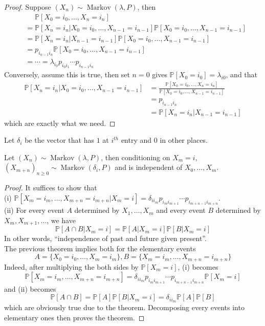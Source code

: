 \begin{proof}
    Suppose $(X_n)\sim\operatorname{Markov}(\lambda,P)$, then
    \begin{align*}
        &\phantom{=}\mathbb P[X_0=i_0,\ldots,X_n=i_n]\\
        &=\mathbb P[X_n=i_n|X_0=i_0,\ldots,X_{n-1}=i_{n-1}]\mathbb P[X_0=i_0,\ldots,X_{n-1}=i_{n-1}]\\
        &=\mathbb P[X_n=i_n|X_{n-1}=i_{n-1}]\mathbb P[X_0=i_0,\ldots,X_{n-1}=i_{n-1}]\\
        &=p_{i_{n-1}i_n}\mathbb P[X_0=i_0,\ldots,X_{n-1}=i_{n-1}]\\
        &=\cdots=\lambda_{i_0}p_{i_0i_1}\cdots p_{i_{n-1}i_n}
    \end{align*}
    Conversely, assume this is true, then set $n=0$ gives $\mathbb P[X_0=i_0]=\lambda_{i0}$, and that
    \begin{align*}
        \mathbb P[X_n=i_n|X_0=i_0,\ldots,X_{n-1}=i_{n-1}]&=\frac{\mathbb P[X_0=i_0,\ldots,X_n=i_n]}{\mathbb P[X_0=i_0,\ldots,X_{n-1}=i_{n-1}]}\\
        &=p_{i_{n-1}i_n}\\
        &=\mathbb P[X_n=i_n|X_{n-1}=i_{n-1}]
    \end{align*}
    which are exactly what we need.
\end{proof}
Let $\delta_i$ be the vector that has $1$ at $i^{th}$ entry and $0$ in other places.
\begin{theorem}
    Let $(X_n)\sim\operatorname{Markov}(\lambda,P)$, then conditioning on $X_m=i$, $(X_{m+n})_{n\ge 0}\sim\operatorname{Markov}(\delta_i,P)$ and is independent of $X_0,\ldots,X_m$.
\end{theorem}
\begin{proof}
    It suffices to show that\\
    (i) $\mathbb P[X_m=i_m,\ldots,X_{m+n}=i_{m+n}|X_m=i]=\delta_{ii_m}p_{i_mi_{m+1}}\cdots p_{i_{m+n-1}i_{m+n}}$.\\
    (ii) For every event $A$ determined by $X_1,\ldots,X_m$ and every event $B$ determined by $X_m,X_{m+1},\ldots$, we have
    $$\mathbb P[A\cap B|X_m=i]=\mathbb P[A|X_m=i]\mathbb P[B|X_m=i]$$
    In other words, ``independence of past and future given present''.\\
    The previous theorem implies both for the elementary events
    $$A=\{X_0=i_0,\ldots,X_m=i_m\},B=\{X_m=i_m,\ldots,X_{m+n}=i_{m+n}\}$$
    Indeed, after multiplying the both sides by $\mathbb P[X_m=i]$, (i) becomes
    $$\mathbb P[X_m=i_m,\ldots,X_{m+n}=i_{m+n}]=\delta_{ii_m}p_{i_mi_{m+1}}\cdots p_{i_{m+n-1}i_{m+n}}\mathbb P[X_m=i]$$
    and (ii) becomes
    $$\mathbb P[A\cap B]=\mathbb P[A]\mathbb P[B|X_m=i]=\delta_{ii_m}\mathbb P[A]\mathbb P[B]$$
    which are obviously true due to the theorem.
    Decomposing every events into elementary ones then proves the theorem.
\end{proof}
